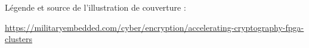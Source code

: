 \thispagestyle{empty}
\vspace*{500pt} %
Légende et source de l'illustration de couverture :

\href{https://militaryembedded.com/cyber/encryption/accelerating-cryptography-fpga-clusters}{https://militaryembedded.com/cyber/encryption/accelerating-cryptography-fpga-clusters}